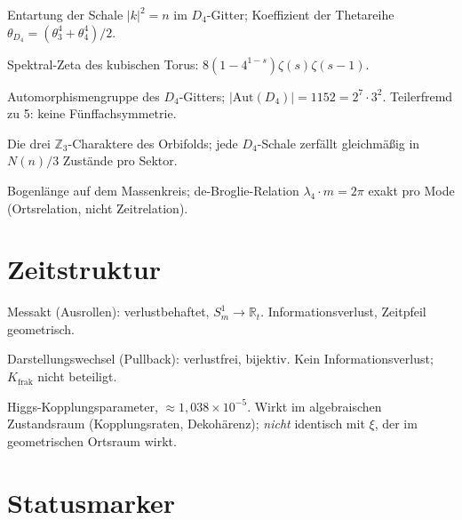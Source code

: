 \begin{description}[leftmargin=4.5em,style=sameline,itemsep=0.4em]
  \item[$N(n)$] Entartung der Schale $|k|^2 = n$ im $D_4$-Gitter;
    Koeffizient der Thetareihe
    $\theta_{D_4} = (\theta_3^4+\theta_4^4)/2$.
  \item[$Z_{\mathbb{Z}^4}(s)$] Spektral-Zeta des kubischen Torus:
    $8(1-4^{1-s})\zeta(s)\zeta(s-1)$.
  \item[$\mathrm{Aut}(D_4)$] Automorphismengruppe des $D_4$-Gitters;
    $|\mathrm{Aut}(D_4)| = 1152 = 2^7\cdot3^2$. Teilerfremd zu 5:
    keine Fünffachsymmetrie.
  \item[$\chi_0,\chi_1,\chi_2$] Die drei $\mathbb{Z}_3$-Charaktere des
    Orbifolds; jede $D_4$-Schale zerfällt gleichmäßig in
    $N(n)/3$ Zustände pro Sektor.
  \item[$\lambda_4$] Bogenlänge auf dem Massenkreis; de-Broglie-Relation
    $\lambda_4\cdot m = 2\pi$ exakt pro Mode (Ortsrelation, nicht
    Zeitrelation).
\end{description}

\section*{Zeitstruktur}

\begin{description}[leftmargin=4.5em,style=sameline,itemsep=0.4em]
  \item[Typ I] Messakt (Ausrollen): verlustbehaftet, $S^1_m\to\mathbb{R}_t$.
    Informationsverlust, Zeitpfeil geometrisch.
  \item[Typ III] Darstellungswechsel (Pullback): verlustfrei, bijektiv.
    Kein Informationsverlust; $K_{\mathrm{frak}}$ nicht beteiligt.
  \item[$\xi_{\mathrm{Higgs}}$] Higgs-Kopplungsparameter,
    $\approx 1{,}038\times10^{-5}$. Wirkt im algebraischen
    Zustandsraum (Kopplungsraten, Dekohärenz); \emph{nicht} identisch
    mit $\xi$, der im geometrischen Ortsraum wirkt.
\end{description}

\section*{Statusmarker}

